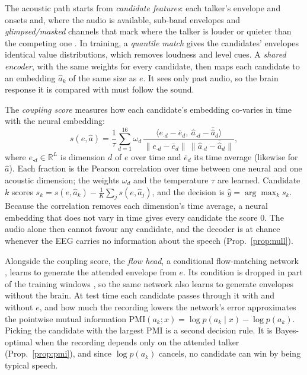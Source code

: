 \documentclass[10pt,twocolumn,letterpaper]{article}
\newcommand{\PMI}{\mathrm{PMI}}
\begin{document}
The acoustic path starts from \emph{candidate features}: each talker's envelope and onsets
and, where the audio is available, sub-band envelopes and \emph{glimpsed/masked} channels
that mark where the talker is louder or quieter than the competing one
\citep{brodbeck2020neural}. In training, a \emph{quantile match} gives the candidates'
envelopes identical value distributions, which removes loudness and level cues. A
\emph{shared encoder}, with the same weights for every candidate, then maps each candidate
to an embedding $\hat a_k$ of the same size as $e$. It sees only past audio, so the brain
response it is compared with must follow the sound.

The \emph{coupling score} measures how each candidate's embedding co-varies in time with
the neural embedding:
\begin{equation}
s(e,\hat a)=\frac{1}{\tau}\sum_{d=1}^{16} \omega_d\,
\frac{\langle e_{\cdot d}-\bar e_d,\ \hat a_{\cdot d}-\bar{\hat a}_{d}\rangle}
{\|e_{\cdot d}-\bar e_d\|\,\|\hat a_{\cdot d}-\bar{\hat a}_{d}\|},
\label{eq:score}
\end{equation}
where $e_{\cdot d}\in\mathbb R^{L}$ is dimension $d$ of $e$ over time and $\bar e_d$ its time
average (likewise for $\hat a$). Each fraction is the Pearson correlation over time between one
neural and one acoustic dimension; the weights $\omega_d$ and the temperature $\tau$ are
learned. Candidate $k$ scores $s_k=s(e,\hat a_k)-\frac1K\sum_{j}s(e,\hat a_j)$, and the
decision is $\hat y=\arg\max_k s_k$. Because the correlation removes each dimension's time
average, a neural embedding that does not vary in time gives every candidate the score 0.
The audio alone then cannot favour any candidate, and the decoder is at chance whenever the
EEG carries no information about the speech (Prop.~\ref{prop:null}).

Alongside the coupling score, the \emph{flow head}, a conditional flow-matching network
\citep{lipman2023flow}, learns to generate the attended envelope from $e$. Its condition is
dropped in part of the training windows \citep{ho2022classifierfree}, so the same network
also learns to generate envelopes without the brain. At test time each candidate passes
through it with and without $e$, and how much the recording lowers the network's error
approximates the pointwise mutual information $\PMI(a_k;x)=\log p(a_k\mid x)-\log p(a_k)$.
Picking the candidate with the largest PMI is a second decision rule. It is Bayes-optimal
when the recording depends only on the attended talker (Prop.~\ref{prop:pmi}), and since
$\log p(a_k)$ cancels, no candidate can win by being typical speech.
\end{document}
